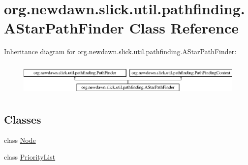 \hypertarget{classorg_1_1newdawn_1_1slick_1_1util_1_1pathfinding_1_1_a_star_path_finder}{}\section{org.\+newdawn.\+slick.\+util.\+pathfinding.\+A\+Star\+Path\+Finder Class Reference}
\label{classorg_1_1newdawn_1_1slick_1_1util_1_1pathfinding_1_1_a_star_path_finder}
Inheritance diagram for org.\+newdawn.\+slick.\+util.\+pathfinding.\+A\+Star\+Path\+Finder\+:\begin{figure}[H]
\begin{center}
\leavevmode
\includegraphics[height=1.728395cm]{classorg_1_1newdawn_1_1slick_1_1util_1_1pathfinding_1_1_a_star_path_finder}
\end{center}
\end{figure}
\subsection*{Classes}
\begin{DoxyCompactItemize}
\item 
class \mbox{\hyperlink{classorg_1_1newdawn_1_1slick_1_1util_1_1pathfinding_1_1_a_star_path_finder_1_1_node}{Node}}
\item 
class \mbox{\hyperlink{classorg_1_1newdawn_1_1slick_1_1util_1_1pathfinding_1_1_a_star_path_finder_1_1_priority_list}{Priority\+List}}
\end{DoxyCompactItemize}
